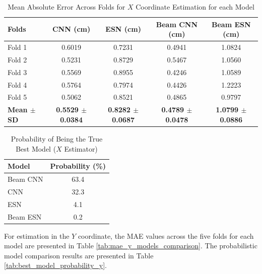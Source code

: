 \begin{table}[H]
  \centering
  \caption{Mean Absolute Error Across Folds for $X$ Coordinate Estimation for each Model}
  \label{tab:mae_x_models_comparison}
  \vspace{0.25cm}
  \footnotesize
  \begin{tabular}{lcccc}
    \toprule
    \textbf{Folds} & \textbf{CNN (cm)} & \textbf{ESN (cm)} & \textbf{Beam CNN (cm)} & \textbf{Beam ESN (cm)} \\
    \midrule
    Fold 1 & 0.6019 & 0.7231 & 0.4941 & 1.0824 \\
    Fold 2 & 0.5231 & 0.8729 & 0.5467 & 1.0560 \\
    Fold 3 & 0.5569 & 0.8955 & 0.4246 & 1.0589 \\
    Fold 4 & 0.5764 & 0.7974 & 0.4426 & 1.2223 \\
    Fold 5 & 0.5062 & 0.8521 & 0.4865 & 0.9797 \\
    \midrule
    \textbf{Mean $\pm$ SD} & \textbf{0.5529 $\pm$ 0.0384} & \textbf{0.8282 $\pm$ 0.0687} & \textbf{0.4789 $\pm$ 0.0478} & \textbf{1.0799 $\pm$ 0.0886} \\
    \bottomrule
  \end{tabular}
\end{table}

\begin{table}[H]
  \centering
  \caption{Probability of Being the True Best Model ($X$ Estimator)}
  \label{tab:best_model_probability_x}
  \vspace{0.25cm}
  \begin{tabular}{lc}
    \toprule
    \textbf{Model} & \textbf{Probability (\%)} \\
    \midrule
    Beam CNN & 63.4 \\
    CNN      & 32.3 \\
    ESN      & 4.1  \\
    Beam ESN & 0.2  \\
    \bottomrule
  \end{tabular}
\end{table}


For estimation in the $Y$ coordinate, the MAE values across the five folds for each model are presented in Table \ref{tab:mae_y_models_comparison}. The probabilistic model comparison results are presented in Table \ref{tab:best_model_probability_y}.

